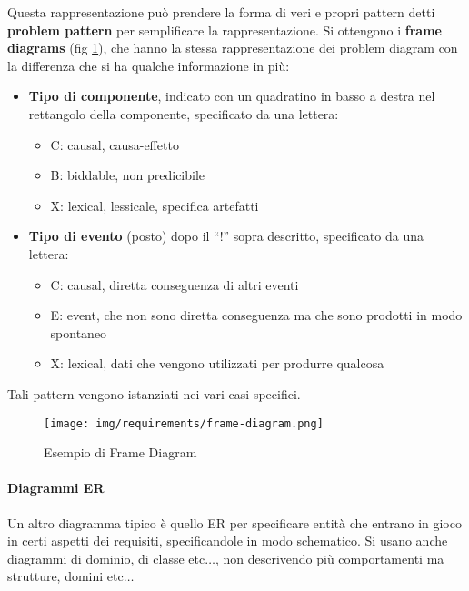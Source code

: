 Questa rappresentazione può prendere la forma di veri e propri pattern detti
\textbf{problem pattern} per semplificare la rappresentazione. Si ottengono i
\textbf{frame diagrams} (fig \ref{fig:frame-diagram}), che hanno la stessa 
rappresentazione dei problem diagram con la differenza che si ha qualche informazione in più:
\begin{itemize}
    \item \textbf{Tipo di componente}, indicato con un quadratino in basso a
          destra nel rettangolo della componente, specificato da una lettera:
          \begin{itemize}
              \item C: causal, causa-effetto
              \item B: biddable, non predicibile
              \item X: lexical, lessicale, specifica artefatti
          \end{itemize}
    \item \textbf{Tipo di evento} (posto) dopo il “!” sopra descritto, specificato
          da una lettera:
          \begin{itemize}
              \item C: causal, diretta conseguenza di altri eventi
              \item E: event, che non sono diretta conseguenza ma che sono prodotti
                    in modo spontaneo
              \item X: lexical, dati che vengono utilizzati per produrre qualcosa
          \end{itemize}
\end{itemize}
Tali pattern vengono istanziati nei vari casi specifici.

\begin{figure}[!ht]
      \centering
      \texttt{[image: img/requirements/frame-diagram.png]}
      \caption{Esempio di Frame Diagram}
      \label{fig:frame-diagram}
  \end{figure}
\paragraph{Diagrammi ER}
Un altro diagramma tipico è quello ER per specificare entità che entrano in gioco
in certi aspetti dei requisiti, specificandole in modo schematico. Si usano anche
diagrammi di dominio, di classe etc$\dots$, non descrivendo più comportamenti
ma strutture, domini etc$\dots$
